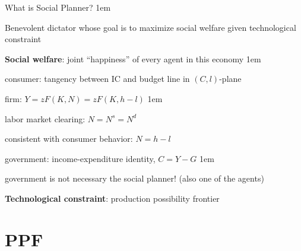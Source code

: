 \documentclass[11pt,aspectratio=43]{beamer}
\let\olditemize=\itemize
\let\endolditemize=\enditemize
\renewenvironment{itemize}{\olditemize \itemsep1em}{\endolditemize}
\theoremstyle{definition}
\begin{document}
\begin{frame}{What is Social Planner?}
\label{slide:What_is_Social_Planner_}
\begin{itemize}
    \item \alert{Benevolent dictator} whose goal is to maximize \alert{social welfare} given \alert{technological constraint}
    \item \textbf{Social welfare}: joint ``happiness'' of every agent in this economy
    \begin{itemize}
        \item \alert{consumer}: tangency between IC and budget line in $ ( C, l ) $-plane
        \item \alert{firm}: $ Y = z F( K, N ) = z F( K, h-l ) $
        \begin{itemize}
            \item labor market clearing: $ N = N^{s} = N^{d} $
            \item consistent with consumer behavior: $ N = h - l $
        \end{itemize}
        \item \alert{government}: income-expenditure identity, $ C = Y - G $
        \begin{itemize}
            \item government is not necessary the social planner! (also one of the agents)
        \end{itemize}
    \end{itemize}
    \item \textbf{Technological constraint}: production possibility frontier
\end{itemize}
\end{frame}

\section{PPF}
\label{sec:PPF}
\end{document}
